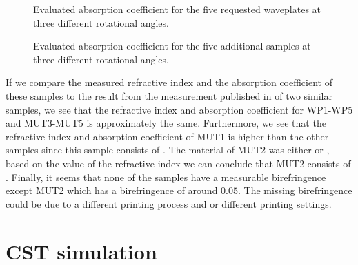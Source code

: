 \begin{figure}[H]
\centering
\subcaptionbox{\label{fig:ceramic_WP1_abs}}
    {\hspace*{-2em}}
\qquad
\subcaptionbox{\label{fig:ceramic_WP2_abs}}
    {\hspace*{-2em}}
\subcaptionbox{\label{fig:ceramic_WP3_abs}}
    {\hspace*{-2em}}
\qquad
\subcaptionbox{\label{fig:ceramic_WP4_abs}}
    {\hspace*{-2em}}
\subcaptionbox{\label{fig:ceramic_WP5_abs}}
    {}
\caption{Evaluated absorption coefficient for the five requested waveplates at three different rotational angles.}
\label{fig:ceramic_WPs_abs}
\end{figure}

\begin{figure}[H]
\centering
\subcaptionbox{\label{fig:ceramic_MUT1_abs}}
    {\hspace*{-2em}}
\qquad
\subcaptionbox{\label{fig:ceramic_MUT2_abs}}
    {\hspace*{-2em}}
\subcaptionbox{\label{fig:ceramic_MUT3_abs}}
    {\hspace*{-2em}}
\qquad
\subcaptionbox{\label{fig:ceramic_MUT4_abs}}
    {\hspace*{-2em}}
\subcaptionbox{\label{fig:ceramic_MUT5_abs}}
    {}
\caption{Evaluated absorption coefficient for the five additional samples at three different rotational angles.}
\label{fig:ceramic_MUTs_abs}
\end{figure}

If we compare the measured refractive index and the absorption coefficient of these  samples to the result from the measurement published in \cite{Ornik2018} of two similar  samples, we see that the refractive index and absorption coefficient for WP1-WP5 and MUT3-MUT5 is approximately the same. Furthermore, we see that the refractive index and absorption coefficient of MUT1 is higher than the other samples since this sample consists of . The material of MUT2 was either  or , based on the value of the refractive index we can conclude that MUT2 consists of . Finally, it seems that none of the samples have a measurable birefringence except MUT2 which has a birefringence of around $0.05$. The missing birefringence could be due to a different printing process and or different printing settings.

\section{CST simulation}
\label{sec:CST simulation}

